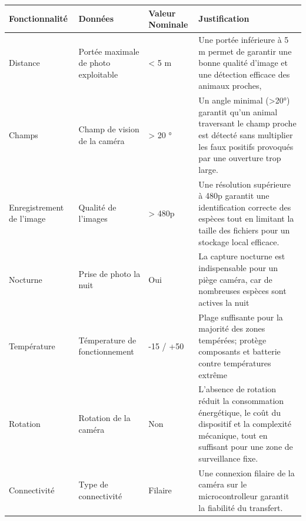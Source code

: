 \begin{table}[ht]
   \centering
   \renewcommand{\arraystretch}{1.2} %
   \begin{tabularx}{\textwidth}{|p{3cm}|p{2.5cm}|p{2.5cm}|X|}
      \hline
      \textbf{Fonctionnalité}   & \textbf{Données}                     & \textbf{Valeur Nominale} & \textbf{Justification}                                                                                                                                            \\
      \hline
      Distance                  & Portée maximale de photo exploitable & < 5 m                    & Une portée inférieure à 5 m permet de garantir une bonne qualité d'image et une détection efficace des animaux proches,                                           \\
      \hline
      Champs                    & Champ de vision de la caméra         & > 20 °                   & Un angle minimal (>20°) garantit qu'un animal traversant le champ proche est détecté sans multiplier les faux positifs provoqués par une ouverture trop large.    \\
      \hline
      Enregistrement de l'image & Qualité de l'images                  & > 480p                   & Une résolution supérieure à 480p garantit une identification correcte des espèces tout en limitant la taille des fichiers pour un stockage local efficace.        \\
      \hline
      Nocturne                  & Prise de photo la nuit               & Oui                      & La capture nocturne est indispensable pour un piège caméra, car de nombreuses espèces sont actives la nuit                                                        \\
      \hline
      Température               & Témperature de fonctionnement        & -15 / +50                & Plage suffisante pour la majorité des zones tempérées; protège composants et batterie contre températures extrême                                                 \\
      \hline
      Rotation                  & Rotation de la caméra                & Non                      & L'absence de rotation réduit la consommation énergétique, le coût du dispositif et la complexité mécanique, tout en suffisant pour une zone de surveillance fixe. \\
      \hline
      Connectivité              & Type de connectivité                 & Filaire                  & Une connexion filaire de la caméra sur le microcontrolleur garantit la fiabilité du transfert.                                                                    \\

\end{tabularx}
\end{table}
